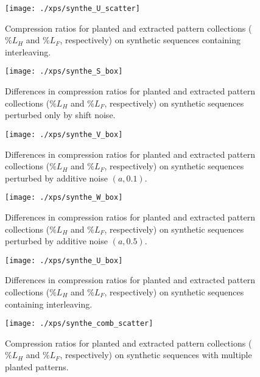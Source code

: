 \documentclass{report}
\newcommand{\cl}{\mathit{L}}
\newcommand{\prcCl}{\%\cl}
\begin{document}
\begin{figure}[tbp] \centering
\caption{Compression ratios for planted and extracted pattern collections ($\prcCl_H$ and $\prcCl_F$, respectively) on synthetic sequences containing interleaving.}
\label{fig:synthe_4_cr}
\texttt{[image: ./xps/synthe\_U\_scatter]}
\end{figure}

\begin{figure}[tbp] \centering
\caption{Differences in compression ratios for planted and extracted pattern collections ($\prcCl_H$ and $\prcCl_F$, respectively) on synthetic sequences perturbed only by shift noise.}
\label{fig:synthe_1}
\texttt{[image: ./xps/synthe\_S\_box]}
\end{figure}

\begin{figure}[tbp] \centering
\caption{Differences in compression ratios for planted and extracted pattern collections ($\prcCl_H$ and $\prcCl_F$, respectively) on synthetic sequences perturbed by additive noise $(a, 0.1)$.}
\label{fig:synthe_2}
\texttt{[image: ./xps/synthe\_V\_box]}
\end{figure}

\begin{figure}[tbp] \centering
\caption{Differences in compression ratios for planted and extracted pattern collections ($\prcCl_H$ and $\prcCl_F$, respectively) on synthetic sequences perturbed by additive noise $(a, 0.5)$.}
\label{fig:synthe_3}
\texttt{[image: ./xps/synthe\_W\_box]}
\end{figure}

\begin{figure}[tbp] \centering
\caption{Differences in compression ratios for planted and extracted pattern collections ($\prcCl_H$ and $\prcCl_F$, respectively) on synthetic sequences containing interleaving.}
\label{fig:synthe_4}
\texttt{[image: ./xps/synthe\_U\_box]}
\end{figure}

\begin{figure}[tbp] \centering
\caption{Compression ratios for planted and extracted pattern collections ($\prcCl_H$ and $\prcCl_F$, respectively) on synthetic sequences with multiple planted patterns.}
\label{fig:synthe_comb_cr}
\texttt{[image: ./xps/synthe\_comb\_scatter]}
\end{figure}
\end{document}

